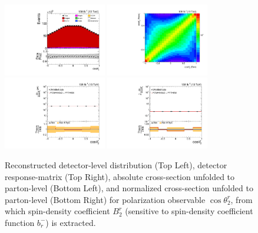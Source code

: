 \clearpage
\begin{figure}[htb]
\begin{center}
 \includegraphics[width=0.40\textwidth]{fig_fullRun2UL/controlplots/combined/Hyp_LeptonBr.pdf}
 \includegraphics[width=0.40\textwidth]{fig_fullRun2UL/unfolding/combined/ResponseMatrix_b2r.pdf} \\
 \includegraphics[width=0.40\textwidth]{fig_fullRun2UL/unfolding/combined/UnfoldedResults_b2r.pdf}
 \includegraphics[width=0.40\textwidth]{fig_fullRun2UL/unfolding/combined/UnfoldedResultsNorm_b2r.pdf} \\
\label{fig:b2r}
\caption{Reconstructed detector-level distribution (Top Left), detector response-matrix (Top Right), absolute cross-section unfolded to parton-level (Bottom Left), and normalized cross-section unfolded to parton-level (Bottom Right) for polarization observable $\cos\theta_{2}^{r}$, from which spin-density coefficient $B_{2}^{r}$ (sensitive to spin-density coefficient function $b_r^{-}$) is extracted.}
\end{center}
\end{figure}
